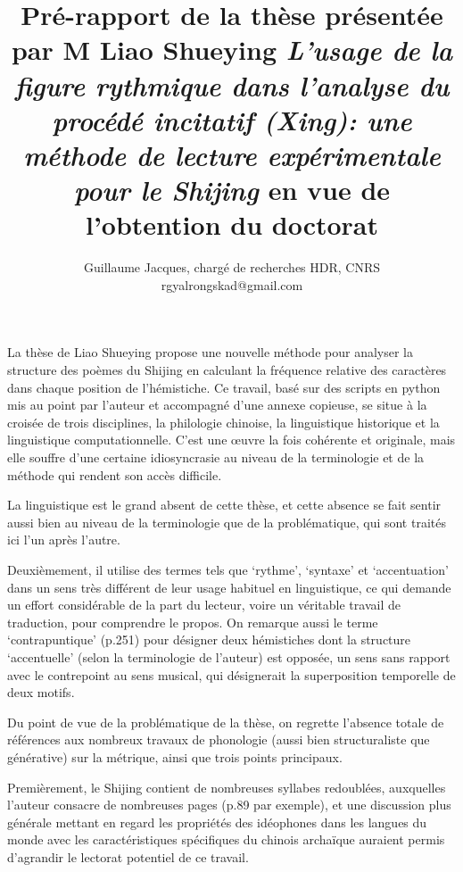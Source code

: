 \documentclass[oldfontcommands,oneside,a4paper,11pt]{article}
\begin{document}
 
\title{Pré-rapport de la thèse présentée par M Liao Shueying \textit{L'usage de la figure rythmique dans l'analyse du procédé incitatif (Xing): une méthode de lecture expérimentale pour le Shijing} en vue de l'obtention du doctorat }
\author{Guillaume Jacques, chargé de recherches HDR, CNRS\\rgyalrongskad@gmail.com}
\maketitle

La thèse de Liao Shueying propose une nouvelle méthode pour analyser la structure des poèmes du Shijing en calculant la fréquence relative des caractères dans chaque position de l'hémistiche. Ce travail, basé sur des scripts en python mis au point par l'auteur et accompagné d'une annexe copieuse, se situe à la croisée de trois disciplines, la philologie chinoise, la linguistique historique et la linguistique computationnelle. C'est une œuvre la fois cohérente et originale, mais elle souffre d'une certaine idiosyncrasie au niveau de la terminologie et de la méthode qui rendent son accès difficile. 


La linguistique est le grand absent de cette thèse, et cette absence se fait sentir aussi bien au niveau de la terminologie que de la problématique, qui sont traités ici l'un après l'autre.



Deuxièmement, il utilise des termes tels que `rythme', `syntaxe' et `accentuation' dans un sens très différent de leur usage habituel en linguistique, ce qui demande un effort considérable de la part du lecteur, voire un véritable travail de traduction, pour comprendre le propos. On remarque aussi le terme `contrapuntique' (p.251) pour désigner deux hémistiches dont la structure `accentuelle' (selon la terminologie de l'auteur) est opposée, un sens sans rapport avec le contrepoint au sens musical, qui désignerait la superposition temporelle de deux motifs.

Du point de vue de la problématique de la thèse, on regrette l'absence totale de références aux nombreux travaux de phonologie (aussi bien structuraliste que générative) sur la métrique, ainsi que trois points principaux.

Premièrement, le Shijing contient de nombreuses syllabes redoublées, auxquelles l'auteur consacre de nombreuses pages (p.89 par exemple), et une discussion plus générale mettant en regard les propriétés des idéophones dans les langues du monde avec les caractéristiques spécifiques du chinois archaïque auraient permis d'agrandir le lectorat potentiel de ce travail.
\end{document}
